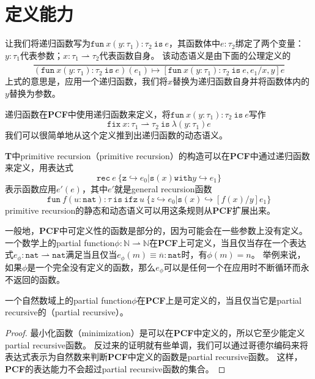 \section{定义能力}

让我们将递归函数写为\(\mathtt{fun}\ x(y: \tau_1): \tau_2\ \mathtt{is}\ e\)，其函数体中\(e:\tau_2\)绑定了两个变量：\(y: \tau_1\)代表参数；\(x: \tau_1 \rightharpoonup \tau_2\)代表函数自身。
该动态语义是由下面的公理定义的
\[
	\frac{}{
		(\mathtt{fun}\ x(y: \tau_1): \tau_2\ \mathtt{is}\ e)(e_1) \longmapsto [\mathtt{fun}\ x(y: \tau_1): \tau_2\ \mathtt{is}\ e, e_1/x, y]e
	}
\]
上式的意思是，应用一个递归函数，我们将\(x\)替换为递归函数自身并将函数体内的\(y\)替换为参数。

递归函数在\textbf{PCF}中使用递归函数来定义，将\(\mathtt{fun}\ x(y: \tau_1): \tau_2\ \mathtt{is}\ e\)写作
\[
	\mathtt{fix}\ x: \tau_1 \rightharpoonup \tau_2\ \mathtt{is}\ \lambda (y: \tau_1)e
\]
我们可以很简单地从这个定义推到出递归函数的动态语义。

\textbf{T}中\gls{primitive recursion}（primitive recursion）的构造可以在\textbf{PCF}中通过递归函数来定义，用表达式
\[
	\mathtt{rec}\ e\ \{\mathtt{z} \hookrightarrow e_0 | \mathtt{s}(x) \mathtt{with} y \hookrightarrow e_1\}
\]
表示函数应用\(e'(e)\)，其中\(e'\)就是\gls{general recursion}函数
\[
	\mathtt{fun}\ f(u: \mathtt{nat}): \tau\ \mathtt{is}\ \mathtt{ifz}\ u\ \{z \hookrightarrow e_0 | \mathtt{s}(x) \hookrightarrow [f(x)/y]e_1\}
\]
\gls{primitive recursion}的静态和动态语义可以用这条规则从\textbf{PCF}扩展出来。

一般地，\textbf{PCF}中可定义性的函数是部分的，因为可能会在一些参数上没有定义。
一个数学上的\gls{partial function}\(\phi: \mathbb{N} \rightharpoonup \mathbb{N}\)在\textbf{PCF}上可定义，当且仅当存在一个表达式\(e_\phi : \mathtt{nat} \rightharpoonup \mathtt{nat}\)满足当且仅当\(e_\phi(m) \equiv \overline{n}: \mathtt{nat}\)时，有\(\phi(m) = n\)。
举例来说，如果\(\phi\)是一个完全没有定义的函数，那么\(e_\phi\)可以是任何一个在应用时不断循环而永不返回的函数。

\begin{theorem}
	一个自然数域上的\gls{partial function}\(\phi\)在\textbf{PCF}上是可定义的，当且仅当它是\gls{partial recursive}的（partial recursive）。
\end{theorem} 

\begin{proof}
	最小化函数（minimization）是可以在\textbf{PCF}中定义的，所以它至少能定义\gls{partial recursive}函数。
	反过来的证明就有些单调，我们可以通过哥德尔编码来将表达式表示为自然数来判断\textbf{PCF}中定义的函数是\gls{partial recursive}函数。
	这样，\textbf{PCF}的表达能力不会超过\gls{partial recursive}函数的集合。
\end{proof}

